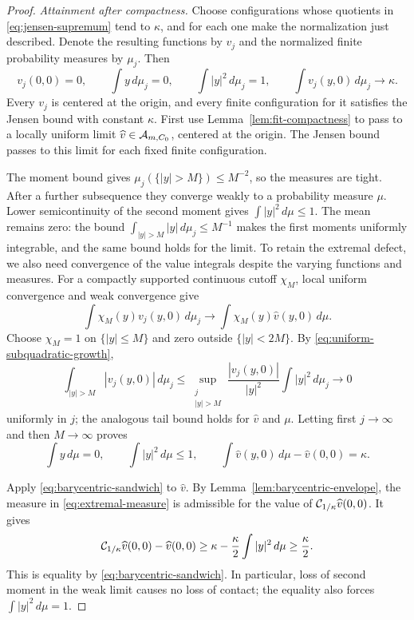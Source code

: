 \begin{proof}
\emph{Attainment after compactness.}
Choose configurations whose quotients in
\eqref{eq:jensen-supremum} tend to $\kappa$, and for each one
make the normalization just described. Denote the resulting
functions by $v_j$ and the normalized finite probability
measures by $\mu_j$. Then
\[
  v_j(0,0)=0,\qquad
  \int y\,d\mu_j=0,\qquad
  \int |y|^2\,d\mu_j=1,\qquad
  \int v_j(y,0)\,d\mu_j\longrightarrow\kappa.
\]
Every $v_j$ is centered at the origin, and every finite
configuration for it satisfies the Jensen bound with constant
$\kappa$. First use Lemma~\ref{lem:fit-compactness} to pass to
a locally uniform limit $\widehat v\in\mathcal{A}_{m,C_0}$,
centered at the origin. The Jensen bound passes to this limit
for each fixed finite configuration.

The moment bound gives
$\mu_j(\{|y|>M\})\le M^{-2}$, so the measures are tight.
After a further subsequence they converge weakly to a
probability measure $\mu$. Lower semicontinuity of the second
moment gives $\int|y|^2\,d\mu\le1$. The mean remains zero:
the bound
$\int_{|y|>M}|y|\,d\mu_j\le M^{-1}$ makes the first moments
uniformly integrable, and the same bound holds for the limit.
To retain the extremal defect, we also need convergence of the value
integrals despite the varying functions and measures. For a compactly
supported continuous cutoff $\chi_M$, local uniform
convergence and weak convergence give
\[
  \int\chi_M(y)v_j(y,0)\,d\mu_j
       \longrightarrow
  \int\chi_M(y)\widehat v(y,0)\,d\mu.
\]
Choose $\chi_M=1$ on $\{|y|\le M\}$ and zero outside
$\{|y|<2M\}$. By
\eqref{eq:uniform-subquadratic-growth},
\[
  \int_{|y|>M}|v_j(y,0)|\,d\mu_j
  \le
  \sup_{\substack{j\\|y|>M}}\frac{|v_j(y,0)|}{|y|^2}
       \int|y|^2\,d\mu_j
  \longrightarrow0
\]
uniformly in $j$; the analogous tail bound holds for
$\widehat v$ and $\mu$. Letting first $j\to\infty$ and then
$M\to\infty$ proves
\begin{equation}\label{eq:extremal-measure}
  \int y\,d\mu=0,\qquad
  \int|y|^2\,d\mu\le1,\qquad
  \int\widehat v(y,0)\,d\mu-\widehat v(0,0)=\kappa.
\end{equation}

Apply \eqref{eq:barycentric-sandwich} to $\widehat v$. By
Lemma~\ref{lem:barycentric-envelope}, the measure in
\eqref{eq:extremal-measure} is admissible for the value of
$\mathcal{C}_{1/\kappa}\widehat v(0,0)$. It gives
\[
  \mathcal{C}_{1/\kappa}\widehat v(0,0)-\widehat v(0,0)
     \ge\kappa-\frac{\kappa}{2}\int|y|^2\,d\mu
     \ge\frac{\kappa}{2}.
\]
This is equality by \eqref{eq:barycentric-sandwich}. In
particular, loss of second moment in the weak limit causes no
loss of contact; the equality also forces
$\int|y|^2\,d\mu=1$.


\end{proof}
